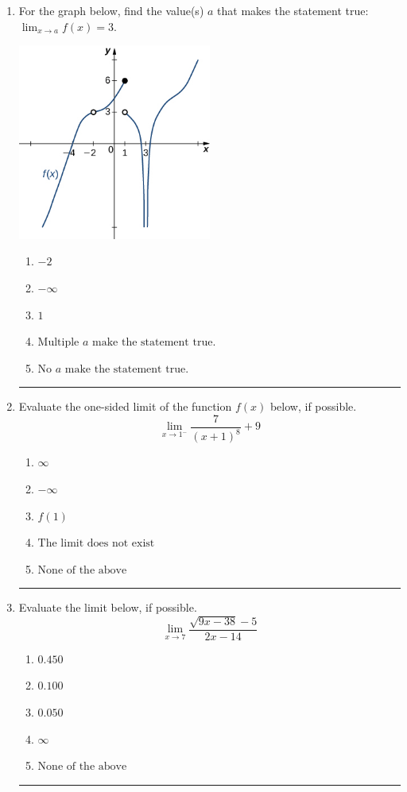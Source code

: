 \documentclass[14pt]{extbook}
\newcommand{\litem}[1]{\item#1\hspace*{-1cm}\rule{\textwidth}{0.4pt}}
\begin{document}
\begin{enumerate}
{\begin{enumerate}[label=\Alph*.]
\end{enumerate} }
\litem{
For the graph below, find the value(s) $a$ that makes the statement true: $ \displaystyle \lim_{x \rightarrow a} f(x) = 3$.
\begin{center}
    \includegraphics[width=0.5\textwidth]{../Figures/evaluateLimitGraphicallyCopyA.png}
\end{center}
\begin{enumerate}[label=\Alph*.]
\item \( -2 \)
\item \( -\infty \)
\item \( 1 \)
\item \( \text{Multiple } a \text{ make the statement true}. \)
\item \( \text{No } a \text{ make the statement true}. \)

\end{enumerate} }
\litem{
Evaluate the one-sided limit of the function $f(x)$ below, if possible.\[ \lim_{x \rightarrow 1^-} \frac{7}{(x+1)^8}+9 \]\begin{enumerate}[label=\Alph*.]
\item \( \infty \)
\item \( -\infty \)
\item \( f(1) \)
\item \( \text{The limit does not exist} \)
\item \( \text{None of the above} \)

\end{enumerate} }
\litem{
Evaluate the limit below, if possible.\[ \lim_{x \rightarrow 7} \frac{\sqrt{9x - 38} - 5}{2x - 14} \]\begin{enumerate}[label=\Alph*.]
\item \( 0.450 \)
\item \( 0.100 \)
\item \( 0.050 \)
\item \( \infty \)
\item \( \text{None of the above} \)


\end{enumerate}}
\end{enumerate}
\end{document}
